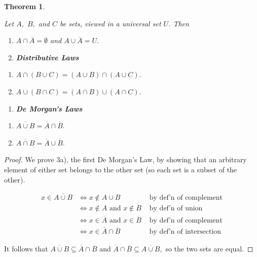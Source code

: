 \documentclass[
]{book}
\providecommand{\tightlist}{%
  \setlength{\itemsep}{0pt}\setlength{\parskip}{0pt}}
\newtheorem{theorem}{Theorem}[chapter]
\theoremstyle{definition}
\theoremstyle{definition}
\theoremstyle{definition}
\theoremstyle{definition}
\theoremstyle{remark}
\begin{document}
\begin{theorem}
\protect\hypertarget{thm:basic-set-props}{}\label{thm:basic-set-props}

Let \(A,\) \(B,\) and \(C\) be sets, viewed in a universal set \(U\). Then

\begin{enumerate}
\def\labelenumi{\arabic{enumi}.}
\item
  \(A \cap \overline{A} = \emptyset\) and \(A \cup \overline{A} = U.\)
\item
  \textbf{Distributive Laws}
\end{enumerate}

\begin{enumerate}
\def\labelenumi{\alph{enumi})}
\tightlist
\item
  \(A \cap (B \cup C) = (A \cup B) \cap (A \cup C).\)
\item
  \(A \cup (B \cap C) = (A \cap B) \cup (A \cap C).\)
\end{enumerate}

\begin{enumerate}
\def\labelenumi{\arabic{enumi}.}
\setcounter{enumi}{2}
\tightlist
\item
  \textbf{De Morgan's Laws}
\end{enumerate}

\begin{enumerate}
\def\labelenumi{\alph{enumi})}
\tightlist
\item
  \(\overline{A \cup B} = \overline{A} \cap \overline{B}.\)
\item
  \(\overline{A \cap B} = \overline{A} \cup \overline{B}.\)
\end{enumerate}

\end{theorem}

\begin{proof}
We prove 3a), the first De Morgan's Law, by showing that an arbitrary element of either set belongs to the other set (so each set is a subset of the other).

\begin{align*}
x \in \overline{A \cup B} &\iff x \notin A \cup B & \text{ by def'n of complement}\\
    &\iff x \notin A \text{ and } x \notin B & \text{ by def'n of union}\\
    &\iff x \in \overline{A} \text{ and } x \in \overline{B} & \text{ by def'n of complement} \\
    &\iff x \in \overline{A} \cap \overline{B} & \text{ by def'n of intersection}
\end{align*}

It follows that \(\overline{A \cup B} \subseteq \overline{A} \cap \overline{B}\) and \(\overline{A} \cap \overline{B} \subseteq \overline{A \cup B},\) so the two sets are equal.
\end{proof}
\end{document}
